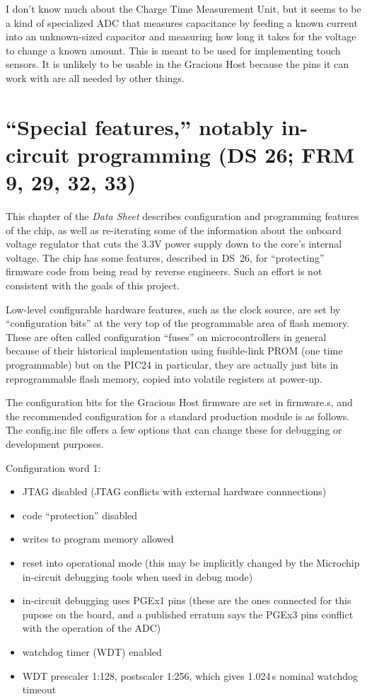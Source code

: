 I don't know much about the Charge Time Measurement Unit, but it seems to be
a kind of specialized ADC that measures capacitance by feeding a known
current into an unknown-sized capacitor and measuring how long it takes for
the voltage to change a known amount.  This is meant to be used for
implementing touch sensors.  It is unlikely to be usable in the Gracious
Host because the pins it can work with are all needed by other things.


\section{``Special features,'' notably in-circuit programming (DS 26; FRM 9,
29, 32, 33)}

This chapter of the \emph{Data Sheet} describes configuration and
programming features of the chip, as well as re-iterating some of the
information about the onboard voltage regulator that cuts the 3.3V power
supply down to the core's internal voltage.  The chip has some features,
described in DS~26, for ``protecting'' firmware code from being read by
reverse engineers.  Such an effort is not consistent with the goals of this
project.

Low-level configurable hardware features, such as the clock source, are set
by ``configuration bits'' at the very top of the programmable area of flash
memory.  These are often called configuration ``fuses'' on microcontrollers
in general because of their historical implementation using fusible-link
PROM (one time programmable) but on the PIC24 in particular, they are
actually just bits in reprogrammable flash memory, copied into volatile
registers at power-up.

The configuration bits for the Gracious Host firmware are set in firmware.s,
and the recommended configuration for a standard production module is as
follows.  The config.inc file offers a few options that can change these for
debugging or development purposes.

Configuration word 1:
\begin{itemize}
  \item JTAG disabled (JTAG conflicts with external hardware connnections)
  \item code ``protection'' disabled
  \item writes to program memory allowed
  \item reset into operational mode (this may be implicitly changed by the
    Microchip in-circuit debugging tools when used in debug mode)
  \item in-circuit debugging uses PGEx1 pins (these are the ones connected
    for this pupose on the board, and a published erratum says the PGEx3
    pins conflict with the operation of the ADC)
  \item watchdog timer (WDT) enabled
  \item WDT prescaler 1:128, postscaler 1:256, which gives 1.024\,s nominal
    watchdog timeout
\end{itemize}

